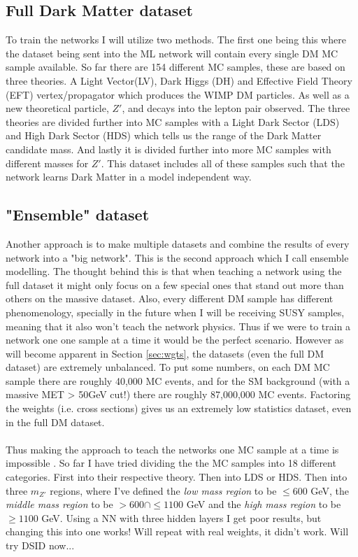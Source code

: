 \documentclass[14pt, a4paper]{book}
\begin{document}
\subsection{Full Dark Matter dataset}
To train the networks I will utilize two methods. The first one being this where the dataset being sent into the ML network will contain every single DM MC sample available. So far there are 154 different MC samples, these are based on three theories. A Light Vector(LV), Dark Higgs (DH) and Effective Field Theory (EFT) vertex/propagator which produces the WIMP DM particles. As well as a new theoretical particle, $Z'$, and decays into the lepton pair observed. The three theories are divided further into MC samples with a Light Dark Sector (LDS) and High Dark Sector (HDS) which tells us the range of the Dark Matter candidate mass. And lastly it is divided further into more MC samples with different masses for $Z'$. This dataset includes all of these samples such that the network learns Dark Matter in a model independent way.

\subsection{"Ensemble" dataset}
Another approach is to make multiple datasets and combine the results of every network into a "big network". This is the second approach which I call ensemble modelling. The thought behind this is that when teaching a network using the full dataset it might only focus on a few special ones that stand out more than others on the massive dataset. Also, every different DM sample has different phenomenology, specially in the future when I will be receiving SUSY samples, meaning that it also won't teach the network physics. Thus if we were to train a network one one sample at a time it would be the perfect scenario. However as will become apparent in Section \ref{sec:wgts}, the datasets (even the full DM dataset) are extremely unbalanced. To put some numbers, on each DM MC sample there are roughly 40,000 MC events, and for the SM background (with a massive MET > 50GeV cut!) there are roughly 87,000,000 MC events. Factoring the weights (i.e. cross sections) gives us an extremely low statistics dataset, even in the full DM dataset. \\
\\Thus making the approach to teach the networks one MC sample at a time is impossible . So far I have tried dividing the the MC samples into 18 different categories. First into their respective theory. Then into LDS or HDS. Then into three $m_{Z'}$ regions, where I've defined the \textit{low mass region} to be $\le 600$ GeV, the \textit{middle mass region} to be $>600 \cap\le 1100$ GeV and the\textit{ high mass region }to be $\ge 1100$ GeV. Using a NN with three hidden layers I get poor results, but changing this into one works! Will repeat with real weights, it didn't work. Will try DSID now...
\end{document}
